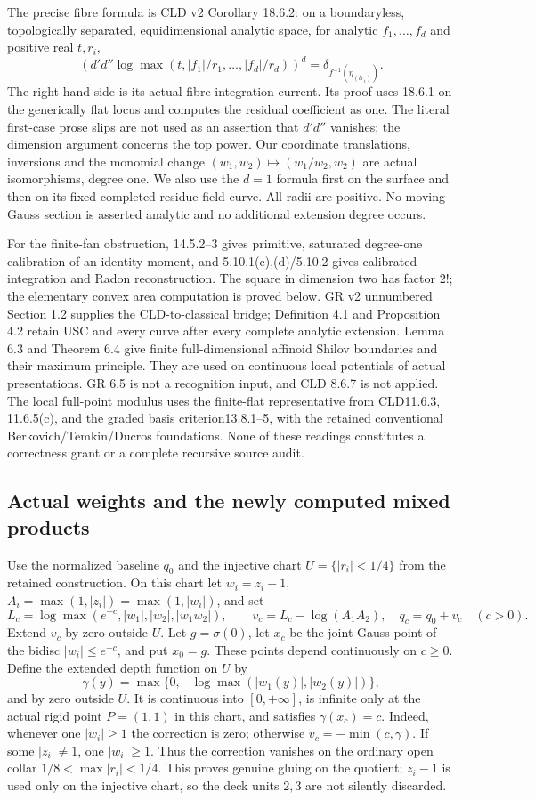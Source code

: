 \documentclass[11pt]{article}
\newcommand{\DD}{d'd''}
\begin{document}
The precise fibre formula is CLD v2 Corollary 18.6.2: on a boundaryless,
topologically separated, equidimensional analytic space, for analytic
$f_1,\ldots,f_d$ and positive real $t,r_i$,
\[
 (\DD\log\max(t,|f_1|/r_1,\ldots,|f_d|/r_d))^d
 =\delta_{f^{-1}(\eta_{(tr_i)})}.
\]
The right hand side is its actual fibre integration current. Its proof uses
18.6.1 on the generically flat locus and computes the residual coefficient
as one. The literal first-case prose slips are not used as an assertion
that $\DD$ vanishes; the dimension argument concerns the top power.
Our coordinate translations, inversions and the monomial change
$(w_1,w_2)\mapsto(w_1/w_2,w_2)$ are actual isomorphisms, degree one.
We also use the $d=1$ formula first on the surface and then on its fixed
completed-residue-field curve. All radii are positive. No moving Gauss
section is asserted analytic and no additional extension degree occurs.

For the finite-fan obstruction, 14.5.2--3 gives primitive, saturated
degree-one calibration of an identity moment, and 5.10.1(c),(d)/5.10.2
gives calibrated integration and Radon reconstruction. The square in
dimension two has factor $2!$; the elementary convex area computation is
proved below. GR v2 unnumbered Section 1.2 supplies the CLD-to-classical
bridge; Definition 4.1 and Proposition 4.2 retain USC and every curve after
every complete analytic extension. Lemma 6.3 and Theorem 6.4 give finite
full-dimensional affinoid Shilov boundaries and their maximum principle.
They are used on continuous local potentials of actual presentations.
GR 6.5 is not a recognition input, and CLD 8.6.7 is not applied. The local
full-point modulus uses the finite-flat representative from CLD11.6.3,
11.6.5(c), and the graded basis criterion13.8.1--5, with the retained
conventional Berkovich/Temkin/Ducros foundations. None of these readings
constitutes a correctness grant or a complete recursive source audit.

\subsection{Actual weights and the newly computed mixed products}
Use the normalized baseline $q_0$ and the injective chart
$U=\{|r_i|<1/4\}$ from the retained construction. On this chart let
$w_i=z_i-1$, $A_i=\max(1,|z_i|)=\max(1,|w_i|)$, and set
\[
 L_c=\log\max(e^{-c},|w_1|,|w_2|,|w_1w_2|),\qquad
 v_c=L_c-\log(A_1A_2),\quad q_c=q_0+v_c\quad(c>0).
\]
Extend $v_c$ by zero outside $U$. Let $g=\sigma(0)$, let $x_c$ be the
joint Gauss point of the bidisc $|w_i|\le e^{-c}$, and put $x_0=g$.
These points depend continuously on $c\ge0$. Define the extended depth
function on $U$ by
\[
 \gamma(y)=\max\{0,-\log\max(|w_1(y)|,|w_2(y)|)\},
\]
and by zero outside $U$. It is continuous into $[0,+\infty]$, is infinite
only at the actual rigid point $P=(1,1)$ in this chart, and satisfies
$\gamma(x_c)=c$. Indeed, whenever one $|w_i|\ge1$ the correction is zero;
otherwise $v_c=-\min(c,\gamma)$. If some $|z_i|\ne1$, one $|w_i|\ge1$.
Thus the correction vanishes on the ordinary open collar
$1/8<\max|r_i|<1/4$. This proves genuine gluing on the quotient; $z_i-1$
is used only on the injective chart, so the deck units $2,3$ are not
silently discarded.
\end{document}

